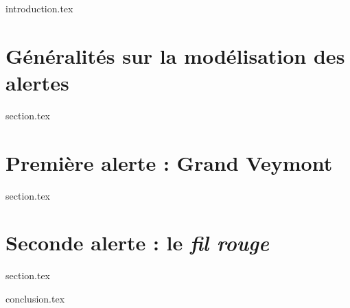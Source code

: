 
\chaptertoc{}

{introduction.tex}

\section{Généralités sur la modélisation des alertes}
\label{sec:9-1}
{section.tex}

\section{Première alerte : Grand Veymont}
\label{sec:9-2}
{section.tex}


\section{Seconde alerte : le \emph{fil rouge}}
\label{sec:9-4}
{section.tex}

{conclusion.tex}

